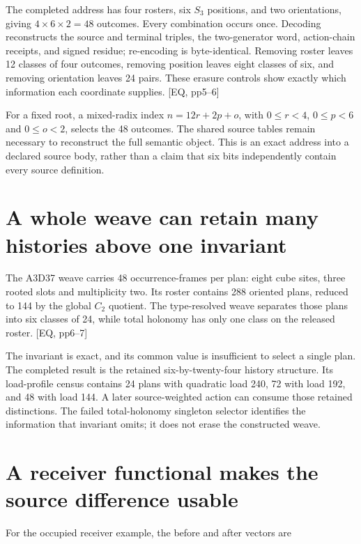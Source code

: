 The completed address has four rosters, six \(S_3\) positions, and two orientations, giving \(4\times6\times2=48\) outcomes. Every combination occurs once. Decoding reconstructs the source and terminal triples, the two-generator word, action-chain receipts, and signed residue; re-encoding is byte-identical. Removing roster leaves 12 classes of four outcomes, removing position leaves eight classes of six, and removing orientation leaves 24 pairs. These erasure controls show exactly which information each coordinate supplies. {[}EQ, pp5--6{]}

For a fixed root, a mixed-radix index \(n=12r+2p+o\), with \(0\le r<4\), \(0\le p<6\) and \(0\le o<2\), selects the 48 outcomes. The shared source tables remain necessary to reconstruct the full semantic object. This is an exact address into a declared source body, rather than a claim that six bits independently contain every source definition.

\section{A whole weave can retain many histories above one invariant}\label{a-whole-weave-can-retain-many-histories-above-one-invariant}

The A3D37 weave carries 48 occurrence-frames per plan: eight cube sites, three rooted slots and multiplicity two. Its roster contains 288 oriented plans, reduced to 144 by the global \(C_2\) quotient. The type-resolved weave separates those plans into six classes of 24, while total holonomy has only one class on the released roster. {[}EQ, pp6--7{]}

The invariant is exact, and its common value is insufficient to select a single plan. The completed result is the retained six-by-twenty-four history structure. Its load-profile census contains 24 plans with quadratic load 240, 72 with load 192, and 48 with load 144. A later source-weighted action can consume those retained distinctions. The failed total-holonomy singleton selector identifies the information that invariant omits; it does not erase the constructed weave.

\section{A receiver functional makes the source difference usable}\label{a-receiver-functional-makes-the-source-difference-usable}

For the occupied receiver example, the before and after vectors are

